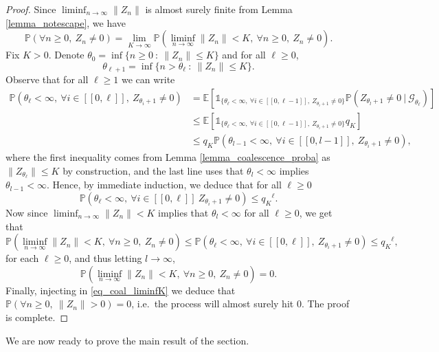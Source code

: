 \documentclass[a4paper, 11pt]{article}
\theoremstyle{plain}
\theoremstyle{definition}
\newcommand{\E}{\mathbb{E}}
\renewcommand{\P}{\mathbb{P}}
\newcommand{\range}[2]{[\![#1,#2]\!]}
\numberwithin{equation}{section}
\begin{document}
\begin{proof}
    Since $\liminf_{n\to\infty}\|Z_n\|$ is almost surely finite from Lemma \ref{lemma_notescape}, we have
        \begin{equation}
            \label{eq_coal_liminfK}
            \P(\forall n\geq 0,~Z_n\neq0)=\lim_{K\to\infty}\P\left(\liminf_{n\to\infty}\|Z_n\|<K,~\forall n\geq 0,~Z_n\neq0\right).
        \end{equation}
    Fix $K>0$. Denote $\theta_0=\inf\{n\geq 0~:~\|Z_n\|\leq K\}$ and for all $\ell\geq 0$,
        \[\theta_{\ell+1}=\inf\{n>\theta_\ell~:~\|Z_n\|\leq K\}.\]
    Observe that for all $\ell\geq 1$ we can write
        \begin{equation}
            \begin{split}
                \P(\theta_\ell<\infty,~\forall i\in\range{0}{\ell},~Z_{\theta_i+1}\neq0)&=\E[\mathds 1_{\{\theta_\ell<\infty,~\forall i\in\range{0}{\ell-1},~Z_{\theta_i+1}\neq 0\}}\P(Z_{\theta_l+1}\neq0~\vert~\mathcal G_{\theta_\ell})]\\
                &\leq\E[\mathds 1_{\{\theta_\ell<\infty,~\forall i\in\range{0}{\ell-1},~Z_{\theta_i+1}\neq0\}}q_K]\\
                &\leq q_K\P(\theta_{l-1}<\infty,~\forall i\in\range{0}{l-1},~Z_{\theta_i+1}\neq0),
            \end{split}
        \end{equation}
    where the first inequality comes from Lemma \ref{lemma_coalescence_proba} as $\|Z_{\theta_\ell}\|\leq K$ by construction, and the last line uses that $\theta_l<\infty$ implies $\theta_{l-1}<\infty$. Hence, by immediate induction, we deduce that for all $\ell\geq 0$
        \[\P(\theta_\ell<\infty,~\forall i\in\range{0}{\ell}~Z_{\theta_i+1}\neq0)\leq {q_K}^\ell.\]
    Now since $\liminf_{n\to\infty}\|Z_n\|<K$ implies that $\theta_l<\infty$ for all $\ell\geq 0$, we get that
        \[\P\left(\liminf_{n\to\infty}\|Z_n\|<K,~\forall n\geq 0,~Z_n\neq0\right)\leq \P(\theta_\ell<\infty,~\forall i\in\range{0}{\ell},~Z_{\theta_i+1}\neq0)\leq {q_K}^\ell,\]
    for each $\ell\geq 0$, and thus letting $l\to\infty$,
        \[\P\left(\liminf_{n\to\infty}\|Z_n\|<K,~\forall n\geq 0,~Z_n\neq0\right)=0.\]
    Finally, injecting in \eqref{eq_coal_liminfK} we deduce that $\P(\forall n\geq 0,~\|Z_n\|>0)=0$, i.e.\ the process will almost surely hit $0$. The proof is complete.
\end{proof}


We are now ready to prove the main result of the section.
\end{document}
